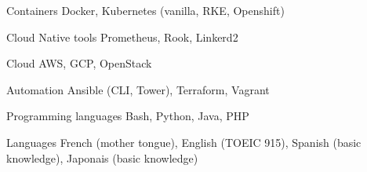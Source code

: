 

\begin{cvskills}

  \cvskill
    {Containers} %
    {Docker, Kubernetes (vanilla, RKE, Openshift)} %

  \cvskill
    {Cloud Native tools} %
    {Prometheus, Rook, Linkerd2} %

  \cvskill
    {Cloud} %
    {AWS, GCP, OpenStack} %

  \cvskill
    {Automation} %
    {Ansible (CLI, Tower), Terraform, Vagrant} %

  \cvskill
    {Programming languages} %
    {Bash, Python, Java, PHP} %

  \cvskill
    {Languages} %
    {French (mother tongue), English (TOEIC 915), Spanish (basic knowledge), Japonais (basic knowledge)} %

\end{cvskills}
